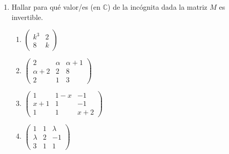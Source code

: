 \documentclass[a4paper]{article}
\newcommand{\exercise}{\item}
\begin{document}
\begin{enumerate}
	\begin{multicols}{2}
	\begin{enumerate} [label=(\alph*)]
		\item $\begin{vmatrix} 3-\lambda & 0 \\ 8 & -1-\lambda \end{vmatrix}=0$
		\item $\begin{vmatrix} 4 & 2x-2 & 0 \\ 3 & 5 & 1 \\ 1 & 4 & x\end{vmatrix}=14$
		\item $\begin{vmatrix} 2 & x & x+1 \\ x+2 & 2 & 8 \\ 2 & 1 & 3\end{vmatrix}=0$
		\item $\begin{vmatrix} 1-\lambda & -1 & 0 \\ -1 & 2-\lambda & -1 \\ 0 & -1 & 1-\lambda\end{vmatrix}=0$
	\end{enumerate}
	\end{multicols}
	\exercise Hallar para qué valor/es (en $\mathbb{C}$) de la incógnita dada la matriz $M$ es invertible.
	\begin{multicols}{2}
	\begin{enumerate} [label=(\alph*)]
		\item $\begin{pmatrix} k^3 & 2 \\ 8 & k \end{pmatrix}$
		\item $\begin{pmatrix} 2 & \alpha & \alpha+1 \\ \alpha+2 & 2 & 8 \\ 2 & 1 & 3\end{pmatrix}$
		\item $\begin{pmatrix} 1 & 1-x & -1 \\ x+1 & 1 & -1 \\ 1 & 1 & x+2\end{pmatrix}$
		\item $\begin{pmatrix} 1 & 1 & \lambda \\ \lambda & 2 & -1 \\ 3 & 1 & 1\end{pmatrix}$

\end{enumerate}
\end{multicols}
\end{enumerate}
\end{document}
